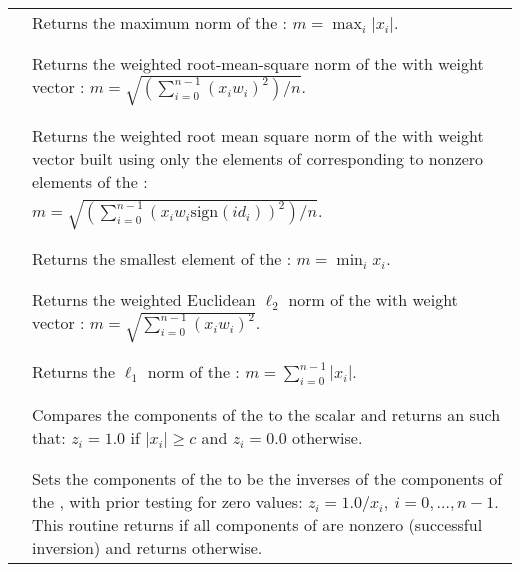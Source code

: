 \begin{supertabular}{|p{\colone}|p{\coltwo}|}
& Returns the maximum norm of the  :
$m = \max_{i} | x_i |$.
\\
&\\
 &  \\
& Returns the weighted root-mean-square norm of the   with
weight vector :
$m = \sqrt{\left( \sum_{i=0}^{n-1} (x_i w_i)^2 \right) / n}$.
\\
&\\
 &  \\
& Returns the weighted root mean square norm of the   with
weight vector  built using only the elements of  corresponding to
nonzero elements of the  :\\
&$m = \sqrt{\left( \sum_{i=0}^{n-1} (x_i w_i \text{sign}(id_i))^2 \right) / n}$.
\\
&\\
 &  \\
& Returns the smallest element of the  :
$m = \min_i x_i $.
\\
&\\
 &  \\
& Returns the weighted Euclidean $\ell_2$ norm of the  
with weight vector : 
$m = \sqrt{\sum_{i=0}^{n-1} (x_i w_i)^2}$.
\\
&\\
 &  \\
& Returns the $\ell_1$ norm of the  :
$m = \sum_{i=0}^{n-1} | x_i |$.
\\
&\\
 &  \\
& Compares the components of the   to the scalar
 and returns an   such that:
$z_i = 1.0$ if $| x_i | \ge c$ and $z_i = 0.0$ otherwise.
\\
&\\
 &  \\
& Sets the components of the   to be the inverses
of the components of the  , with prior testing
for zero values:
$z_i = 1.0 /  x_i  , \: i=0,\ldots,n-1$.
This routine returns  if all components of  are
nonzero (successful inversion) and returns  otherwise.  

\end{supertabular}
